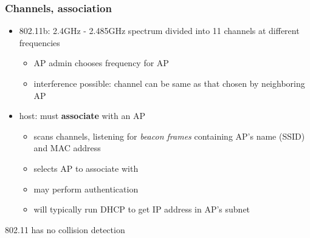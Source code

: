 \subsubsection{Channels, association}
\begin{itemize}
	\item 802.11b: 2.4GHz - 2.485GHz spectrum divided into 11 channels at different frequencies
	\begin{itemize}
		\item AP admin chooses frequency for AP
		\item interference possible: channel can be same as that chosen by neighboring AP
	\end{itemize}
	\item host: must \textbf{associate} with an AP
	\begin{itemize}
		\item scans channels, listening for \textit{beacon frames} containing AP's name (SSID) and MAC address
		\item selects AP to associate with
		\item may perform authentication
		\item will typically run DHCP to get IP address in AP's subnet
	\end{itemize}
\end{itemize}
\begin{leftbar}
	802.11 has no collision detection
\end{leftbar}
